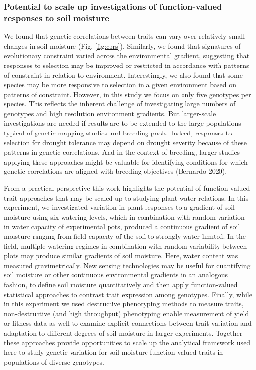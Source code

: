 \documentclass[jou,floatsintext]{apa6}
\begin{document}
\hypertarget{potential-to-scale-up-investigations-of-function-valued-responses-to-soil-moisture}{%
\subsubsection{Potential to scale up investigations of function-valued responses to soil moisture}\label{potential-to-scale-up-investigations-of-function-valued-responses-to-soil-moisture}}

We found that genetic correlations between traits can vary over relatively small changes in soil moisture (Fig. \ref{fig:cors}). Similarly, we found that signatures of evolutionary constraint varied across the environmental gradient, suggesting that responses to selection may be improved or restricted in accordance with patterns of constraint in relation to environment. Interestingly, we also found that some species may be more responsive to selection in a given environment based on patterns of constraint. However, in this study we focus on only five genotypes per species. This reflects the inherent challenge of investigating large numbers of genotypes and high resolution environment gradients. But larger-scale investigations are needed if results are to be extended to the large populations typical of genetic mapping studies and breeding pools. Indeed, responses to selection for drought tolerance may depend on drought severity because of these patterns in genetic correlations. And in the context of breeding, larger studies applying these approaches might be valuable for identifying conditions for which genetic correlations are aligned with breeding objectives (Bernardo 2020).

From a practical perspective this work highlights the potential of function-valued trait approaches that may be scaled up to studying plant-water relations. In this experiment, we investigated variation in plant responses to a gradient of soil moisture using six watering levels, which in combination with random variation in water capacity of experimental pots, produced a continuous gradient of soil moisture ranging from field capacity of the soil to strongly water-limited. In the field, multiple watering regimes in combination with random variability between plots may produce similar gradients of soil moisture. Here, water content was measured gravimetrically. New sensing technologies may be useful for quantifying soil moisture or other continuous environmental gradients in an analogous fashion, to define soil moisture quantitatively and then apply function-valued statistical approaches to contrast trait expression among genotypes. Finally, while in this experiment we used destructive phenotyping methods to measure traits, non-destructive (and high throughput) phenotyping enable measurement of yield or fitness data as well to examine explicit connections between trait variation and adaptation to different degrees of soil moisture in larger experiments. Together these approaches provide opportunities to scale up the analytical framework used here to study genetic variation for soil moisture function-valued-traits in populations of diverse genotypes.
\end{document}
